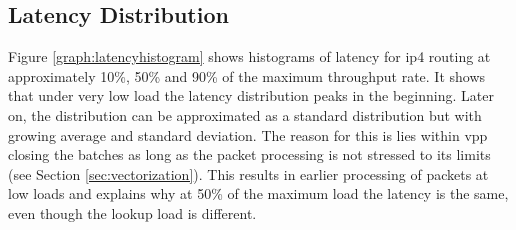 \subsection{Latency Distribution}

Figure \ref{graph:latencyhistogram} shows histograms of latency for
\Ac{ip4} routing at approximately 10\%, 50\% and 90\% of the maximum
throughput rate. It shows that under very low load the latency
distribution peaks in the beginning. Later on, the distribution can be
approximated as a standard distribution but with growing average and
standard deviation. The reason for this is lies within \Ac{vpp}
closing the batches as long as the packet processing is not stressed
to its limits (see Section \ref{sec:vectorization}). This results in earlier
processing of packets at low loads and explains why at 50\% of the
maximum load the latency is the same, even though the lookup load is
different. \cite{linguaglossa2017high}







